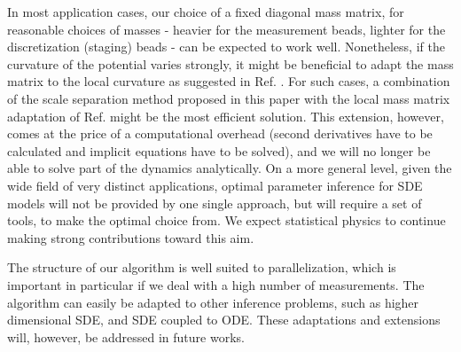 \documentclass[11pt]{article}
\theoremstyle{definition}
\begin{document}
In most application cases, our choice of a fixed diagonal mass matrix, for reasonable choices of masses - heavier for the measurement beads, lighter for the discretization (staging) beads - can be expected to work well.
Nonetheless, if the curvature of the potential varies strongly, it might be beneficial to adapt the mass matrix to the local curvature as suggested in Ref. \cite{girolami_2011_HMC}. For such cases, a combination of the scale separation method proposed in this paper with the local mass matrix adaptation of Ref. \cite{girolami_2011_HMC} might be the most efficient solution. This extension, however, comes at the price of a computational overhead (second derivatives have to be calculated and implicit equations have to be solved), and we will no longer be able to solve part of the dynamics analytically.
On a more general level, given the wide field of very distinct applications, optimal parameter inference for SDE models will not be provided by one single approach, but will require a set of tools, to make the optimal choice from. We expect statistical physics to continue making strong contributions toward this aim.



The structure of our algorithm is well suited to parallelization, which is important in particular if we deal with a high number of measurements. The algorithm can easily be adapted to other inference problems, such as higher dimensional SDE, and SDE coupled to ODE. These adaptations and extensions will, however, be addressed in future works.
\end{document}
